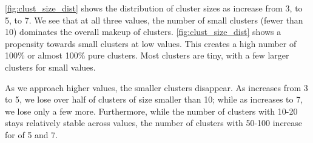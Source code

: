 \autoref{fig:clust_size_dist} shows the distribution of cluster sizes as \minneigh{} increase from 3, to 5, to 7. 
We see that at all three \minneigh{} values, the number of small clusters (fewer than 10) dominates the overall makeup of clusters.
\autoref{fig:clust_size_dist} shows a propensity towards small clusters at low \minneigh{} values.
This creates a high number of 100\% or almost 100\% pure clusters.
Most clusters are tiny, with a few larger clusters for small \minneigh{} values.

As we approach higher \minneigh{} values, the smaller clusters disappear.
As \minneigh{} increases from 3 to 5, we lose over half of clusters of size smaller than 10; while as \minneigh{} increases to 7, we lose only a few more.
Furthermore, while the number of clusters with 10-20 \isols{} stays relatively stable across \minneigh{} values, the number of clusters with 50-100 \isols{} increase for \minneigh{} of 5 and 7.

